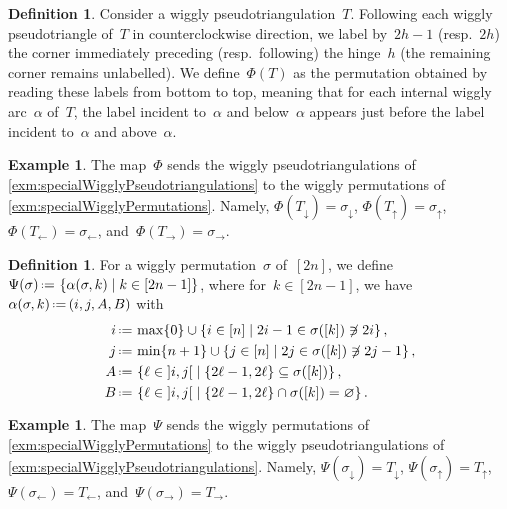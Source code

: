 \documentclass{amsart}
\theoremstyle{definition}
\newtheorem{definition}[theorem]{Definition}
\newtheorem{example}[theorem]{Example}
\newcommand{\set}[2]{\left\{ #1 \;\middle|\; #2 \right\}} %
\newcommand{\eqdef}{\mbox{\,\raisebox{0.2ex}{\scriptsize\ensuremath{\mathrm:}}\ensuremath{=}\,}} %
\begin{document}
\begin{definition}
\label{def:bijection1}
Consider a wiggly pseudotriangulation~$T$.
Following each wiggly pseudotriangle of~$T$ in counterclockwise direction, we label by~$2h-1$ (resp.~$2h$) the corner immediately preceding (resp.~following) the hinge~$h$ (the remaining corner remains unlabelled).
We define~$\Phi(T)$ as the permutation obtained by reading these labels from bottom to top, meaning that for each internal wiggly arc~$\alpha$ of~$T$, the label incident to~$\alpha$ and below~$\alpha$ appears just before the label incident to~$\alpha$ and above~$\alpha$.
\end{definition}

\begin{example}
The map~$\Phi$ sends the wiggly pseudotriangulations of \cref{exm:specialWigglyPseudotriangulations} to the wiggly permutations of \cref{exm:specialWigglyPermutations}.
Namely, $\Phi(T_\downarrow) = \sigma_\downarrow$, $\Phi(T_\uparrow) = \sigma_\uparrow$, $\Phi(T_\leftarrow) = \sigma_\leftarrow$, and~$\Phi(T_\rightarrow) = \sigma_\rightarrow$.
\end{example}

\begin{definition}
\label{def:bijection2}
For a wiggly permutation~$\sigma$ of~$[2n]$, we define~$\Psi(\sigma) \eqdef \set{\alpha(\sigma, k)}{k \in [2n-1]}$, where for~$k \in [2n-1]$, we have~$\alpha(\sigma, k) \eqdef ( i, j, A, B)$ with
\begin{align*}
i & \eqdef \max \{0\} \cup \set{i \in [n]}{2i-1 \in \sigma([k]) \not\ni 2i}, \\
j & \eqdef \min \{n+1\} \cup \set{j \in [n]}{2j \in \sigma([k]) \not\ni 2j-1}, \\
A & \eqdef \set{\ell \in {]i,j[}}{\{2\ell-1, 2\ell\} \subseteq \sigma([k])}, \\
B & \eqdef \set{\ell \in {]i,j[}}{\{2\ell-1, 2\ell\} \cap \sigma([k]) = \varnothing}.
\end{align*}
\end{definition}

\begin{example}
The map~$\Psi$ sends the wiggly permutations of \cref{exm:specialWigglyPermutations} to the wiggly pseudotriangulations of \cref{exm:specialWigglyPseudotriangulations}.
Namely, $\Psi(\sigma_\downarrow) = T_\downarrow$, $\Psi(\sigma_\uparrow) = T_\uparrow$, $\Psi(\sigma_\leftarrow) = T_\leftarrow$, and~$\Psi(\sigma_\rightarrow) = T_\rightarrow$.
\end{example}
\end{document}
